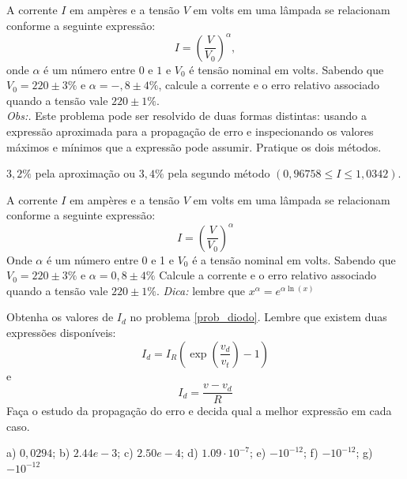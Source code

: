 \documentclass[main.tex]{subfiles}
\begin{document}
\begin{Exercise} A corrente $I$ em ampères e a tensão $V$ em volts em uma lâmpada se relacionam conforme a seguinte expressão:
  \begin{equation*}
    I=\left(\frac{V}{V_0}\right)^\alpha,
  \end{equation*}
onde $\alpha$ é um número entre $0$ e $1$ e $V_0$ é tensão nominal em volts. Sabendo que $V_0=220\pm 3\%$ e $\alpha=-,8\pm 4\%$, calcule a corrente e o erro relativo associado quando a tensão vale $220\pm 1\%$.\\
\emph{Obs:.} Este problema pode ser resolvido de duas formas distintas: usando a expressão aproximada para a propagação de erro e inspecionando os valores máximos e mínimos que a expressão pode assumir. Pratique os dois métodos.
\end{Exercise}
\begin{Answer}
  \begin{tiny}
    $3,2\%$ pela aproximação ou $3,4\%$ pela segundo método  $\left(0,96758 \leq I\leq 1,0342\right)$.
  \end{tiny} 
\end{Answer}

\begin{Exercise} A corrente $I$ em ampères e a tensão $V$ em volts em uma lâmpada se relacionam conforme a seguinte expressão:
$$I=\left(\frac{V}{V_0}\right)^\alpha$$
Onde $\alpha$ é um número entre 0 e 1 e $V_0$ é a tensão nominal em volts. Sabendo que $V_0=220\pm 3\%$ e $\alpha=0,8\pm 4\%$
Calcule a corrente e o erro relativo associado quando a tensão vale $220\pm 1\%$.
\emph{Dica:} lembre que $x^\alpha=e^{\alpha \ln(x)}$
\end{Exercise}

\begin{Exercise}[title= Propagação de erros] Obtenha os valores de $I_d$ no problema \ref{prob_diodo}. Lembre que existem duas expressões disponíveis:
  \begin{equation*}
    I_d=I_R\left(\exp\left(\frac{v_d}{v_t}\right)-1\right)  
  \end{equation*}
e
\begin{equation*}
  I_d=\frac{v-v_d}{R}
\end{equation*}
Faça o estudo da propagação do erro e decida qual a melhor expressão em cada caso.
\end{Exercise}
\begin{Answer}
  \begin{tiny}
  a) $0,0294$; b) $2.44e-3$; c) $2.50e-4$; d) $1.09\cdot 10^{-7}$; e) $- 10^{-12}$; f) $-10^{-12}$; g) $- 10^{-12}$  
  \end{tiny}
\end{Answer}
\end{document}
